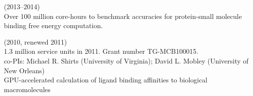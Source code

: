 \documentclass[10pt]{article}
\begin{document}
 (2013--2014) \\
{\small Over 100 million core-hours to benchmark accuracies for protein-small molecule binding free energy computation.} 

 (2010, renewed 2011) \\
{\small 1.3 million service units in 2011. Grant number TG-MCB100015.} \\
{\small co-PIs: Michael R. Shirts (University of Virginia); David L. Mobley (University of New Orleans)} \\
{\small GPU-accelerated calculation of ligand binding affinities to biological macromolecules}

%
\end{document}
